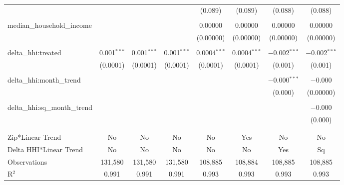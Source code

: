 \begin{table}[H]
{\begin{tabular}{@{\extracolsep{5pt}}lccccccc}
   &  &  &  & (0.089) & (0.089) & (0.088) & (0.088) \\  

   & & & & & & & \\  

  median\_household\_income &  &  &  & 0.00000 & 0.00000 & 0.00000 & 0.00000 \\  

   &  &  &  & (0.00000) & (0.00000) & (0.00000) & (0.00000) \\  

   & & & & & & & \\  

  delta\_hhi:treated & 0.001$^{***}$ & 0.001$^{***}$ & 0.001$^{***}$ & 0.0004$^{***}$ & 0.0004$^{***}$ & $-$0.002$^{***}$ & $-$0.002$^{***}$ \\  

   & (0.0001) & (0.0001) & (0.0001) & (0.0001) & (0.0001) & (0.001) & (0.001) \\  

   & & & & & & & \\  

  delta\_hhi:month\_trend &  &  &  &  &  & $-$0.000$^{***}$ & $-$0.000 \\  

   &  &  &  &  &  & (0.000) & (0.00000) \\  

   & & & & & & & \\  

  delta\_hhi:sq\_month\_trend &  &  &  &  &  &  & $-$0.000 \\  

   &  &  &  &  &  &  & (0.000) \\  

   & & & & & & & \\  

 \hline \\[-1.8ex]  

 Zip*Linear Trend & No & No & No & No & Yes & No & No \\  

 Delta HHI*Linear Trend & No & No & No & No & No & Yes & Sq \\  

 Observations & 131,580 & 131,580 & 131,580 & 108,885 & 108,884 & 108,885 & 108,885 \\  

 R$^{2}$ & 0.991 & 0.991 & 0.991 & 0.993 & 0.993 & 0.993 & 0.993 \\  


\end{tabular}}
\end{table}
